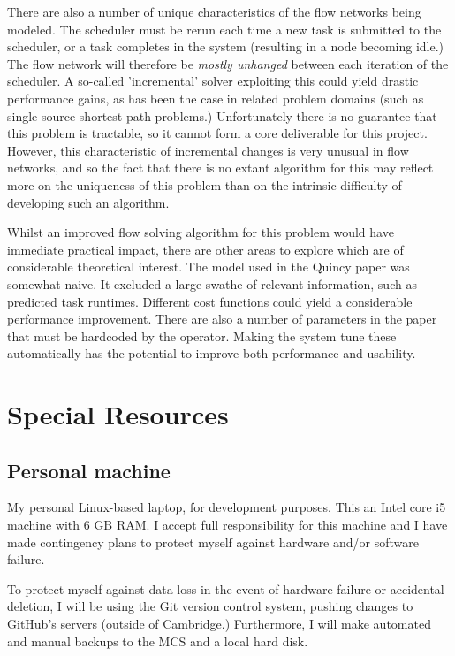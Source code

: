 There are also a number of unique characteristics of the flow networks being modeled. The scheduler must be rerun each time a new task is submitted to the scheduler, or a task completes in the system (resulting in a node becoming idle.) The flow network will therefore be \emph{mostly unhanged} between each iteration of the scheduler. A so-called 'incremental' solver exploiting this could yield drastic performance gains, as has been the case in related problem domains (such as single-source shortest-path problems.) Unfortunately there is no guarantee that this problem is tractable, so it cannot form a core deliverable for this project. However, this characteristic of incremental changes is very unusual in flow networks, and so the fact that there is no extant algorithm for this may reflect more on the uniqueness of this problem than on the intrinsic difficulty of developing such an algorithm.

Whilst an improved flow solving algorithm for this problem would have immediate practical impact, there are other areas to explore which are of considerable theoretical interest. The model used in the Quincy paper was somewhat naive. It excluded a large swathe of relevant information, such as predicted task runtimes. Different cost functions could yield a considerable performance improvement. There are also a number of parameters in the paper that must be hardcoded by the operator. Making the system tune these automatically has the potential to improve both performance and usability. 

\section*{Special Resources}
\label{sec:special-resources}

\subsection*{Personal machine}
My personal Linux-based laptop, for development purposes. This an Intel core i5 machine with 6 GB RAM. I accept full responsibility for this machine and I have made contingency plans to protect myself against hardware and/or software failure.

To protect myself against data loss in the event of hardware failure or accidental deletion, I will be using the Git version control system, pushing changes to GitHub's servers (outside of Cambridge.) Furthermore, I will make automated and manual backups to the MCS and a local hard disk.

